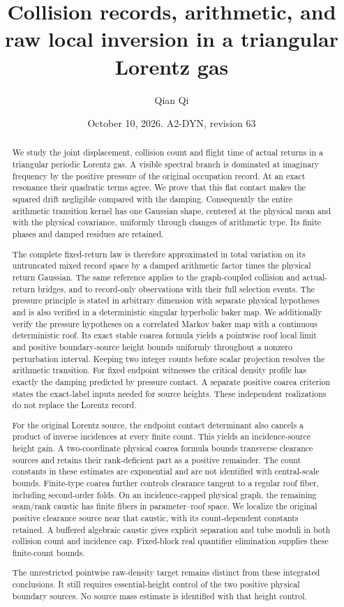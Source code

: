 \documentclass[11pt,reqno]{amsart}
\title[Collision records and raw local inversion]{Collision records, arithmetic, and raw local inversion in a triangular Lorentz gas}
\author{Qian Qi}
\date{October 10, 2026. A2-DYN, revision 63}
\numberwithin{equation}{section}
\theoremstyle{definition}\newtheorem{definition}[theorem]{Definition}
\theoremstyle{remark}\newtheorem{remark}[theorem]{Remark}
\begin{document}
\raggedbottom
\begin{abstract}
We study the joint displacement, collision count and flight time of
actual returns in a triangular periodic Lorentz gas. A visible spectral
branch is dominated at imaginary frequency by the positive pressure
of the original occupation record. At an exact resonance their
quadratic terms agree. We prove that this flat contact makes the
squared drift negligible compared with the damping. Consequently the
entire arithmetic transition kernel has one Gaussian shape, centered
at the physical mean and with the physical covariance, uniformly
through changes of arithmetic type. Its finite phases and damped
residues are retained.

The complete fixed-return law is therefore approximated in total
variation on its untruncated mixed record space by a damped arithmetic
factor times the physical return Gaussian. The same reference applies
to the graph-coupled collision and actual-return bridges, and to
record-only observations with their full selection events. The pressure
principle is stated in arbitrary dimension with separate physical
hypotheses and is also verified in a deterministic singular hyperbolic
baker map. We additionally verify the pressure hypotheses on a
correlated Markov baker map with a continuous deterministic roof. Its
exact stable coarea formula yields a pointwise roof local limit and
positive boundary-source height bounds uniformly throughout a nonzero
perturbation interval. Keeping two integer counts before scalar projection
resolves the arithmetic transition. For fixed endpoint witnesses the
critical density profile has exactly the damping predicted by pressure
contact. A separate positive coarea criterion states the exact-label
inputs needed for source heights. These independent realizations
do not replace the Lorentz record.

For the original Lorentz source, the endpoint contact determinant also
cancels a product of inverse incidences at every finite count. This yields
an incidence-source height gain. A two-coordinate physical coarea formula
bounds transverse clearance sources and retains their rank-deficient
part as a positive remainder. The count constants in these estimates
are exponential and are not identified with central-scale bounds.
Finite-type coarea further controls clearance tangent to a regular
roof fiber, including second-order folds. On an incidence-capped
physical graph, the remaining seam/rank caustic has finite fibers in
parameter--roof space. We localize the original positive clearance
source near that caustic, with its count-dependent constants retained.
A buffered algebraic caustic gives explicit separation and tube moduli
in both collision count and incidence cap. Fixed-block real quantifier
elimination supplies these finite-count bounds.

The unrestricted pointwise raw-density target remains distinct from
these integrated conclusions. It still requires essential-height
control of the two positive physical boundary sources. No source
mass estimate is identified with that height control.
\end{abstract}
\end{document}
